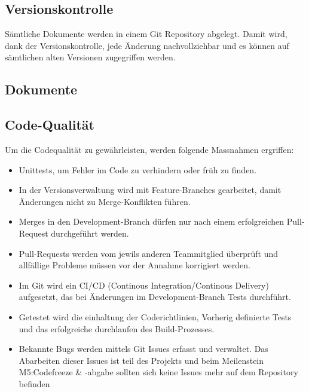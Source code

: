 \documentclass[
	ngerman,
	toc=listof, %
	toc=bibliography, %
	footnotes=multiple, %
	parskip=half, %
	numbers=noendperiod %
]{scrartcl}
\begin{document}
	\subsection{Versionskontrolle}
		Sämtliche Dokumente werden in einem Git Repository abgelegt. Damit wird, dank der Versionskontrolle, 
		jede Änderung nachvollziehbar und es können auf sämtlichen alten Versionen zugegriffen werden.

	\subsection{Dokumente}

	\subsection{Code-Qualität}
		Um die Codequalität zu gewährleisten, werden folgende Massnahmen ergriffen:
		\begin{itemize}
			\item Unittests, um Fehler im Code zu verhindern oder früh zu finden.
			\item In der Versionsverwaltung wird mit Feature-Branches gearbeitet, damit Änderungen nicht zu Merge-Konflikten führen.
			\item Merges in den Development-Branch dürfen nur nach einem erfolgreichen Pull-Request durchgeführt werden.
			\item Pull-Requests werden vom jewils anderen Teammitglied überprüft und allfällige Probleme müssen vor der Annahme korrigiert werden.
			\item Im Git wird ein CI/CD (Continous Integration/Continous Delivery) aufgesetzt, das bei Änderungen im Development-Branch Tests durchführt.
			\item Getestet wird die einhaltung der Coderichtlinien, Vorherig definierte Tests und das erfolgreiche durchlaufen des Build-Prozesses.
			\item Bekannte Bugs werden mittels Git Issues erfasst und verwaltet. Das Abarbeiten dieser Issues ist teil des Projekts und beim Meilenstein M5:Codefreeze \& -abgabe sollten sich keine Issues mehr auf dem Repository befinden
		\end{itemize}
\end{document}
